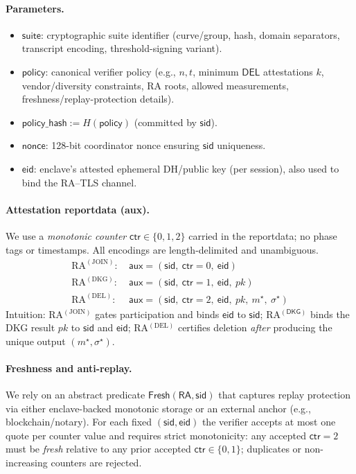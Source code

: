 \documentclass[runningheads,orivec]{llncs}
\begin{document}
\paragraph{Parameters.}
\begin{itemize}[leftmargin=*,itemsep=0.25em]
  \item $\mathsf{suite}$: cryptographic suite identifier (curve/group, hash, domain separators, transcript encoding, threshold-signing variant).
  \item $\mathsf{policy}$: canonical verifier policy (e.g., $n,t$, minimum $\mathsf{DEL}$ attestations $k$, vendor/diversity constraints, RA roots, allowed measurements, freshness/replay-protection details).
  \item $\mathsf{policy\_hash} := H(\mathsf{policy})$ (committed by $\mathsf{sid}$).
  \item $\mathsf{nonce}$: 128-bit coordinator nonce ensuring $\mathsf{sid}$ uniqueness.
  \item $\mathsf{eid}$: enclave’s attested ephemeral DH/public key (per session), also used to bind the RA--TLS channel.
\end{itemize}

\paragraph{Attestation reportdata (aux).}
We use a \emph{monotonic counter} $\mathsf{ctr}\in\{0,1,2\}$ carried in the reportdata; no phase tags or timestamps.
All encodings are length-delimited and unambiguous.
\begin{align*}
  \text{RA}^{(\mathrm{JOIN})}\!:\ & \mathsf{aux} = (\mathsf{sid},\ \mathsf{ctr}{=}0,\ \mathsf{eid}) \\
  \text{RA}^{(\mathrm{DKG})}\!:\ & \mathsf{aux} = (\mathsf{sid},\ \mathsf{ctr}{=}1,\ \mathsf{eid},\ pk) \\
  \text{RA}^{(\mathrm{DEL})}\!:\ & \mathsf{aux} = (\mathsf{sid},\ \mathsf{ctr}{=}2,\ \mathsf{eid},\ pk,\ m^{\star},\ \sigma^{\star})
\end{align*}
Intuition: RA$^{(\mathrm{JOIN})}$ gates participation and binds $\mathsf{eid}$ to $\mathsf{sid}$; RA$^{(\mathsf{DKG})}$ binds the DKG result $pk$ to $\mathsf{sid}$ and $\mathsf{eid}$;
RA$^{(\mathrm{DEL})}$ certifies deletion \emph{after} producing the unique output $(m^{\star},\sigma^{\star})$.

\paragraph{Freshness and anti-replay.}
We rely on an abstract predicate $\textsf{Fresh}(\mathsf{RA},\mathsf{sid})$ that captures replay protection via either enclave-backed monotonic storage
or an external anchor (e.g., blockchain/notary). For each fixed $(\mathsf{sid},\mathsf{eid})$ the verifier accepts at most one quote per counter value and requires
strict monotonicity: any accepted $\mathsf{ctr}{=}2$ must be \emph{fresh} relative to any prior accepted $\mathsf{ctr}{\in}\{0,1\}$; duplicates or non-increasing counters are rejected.
\end{document}
